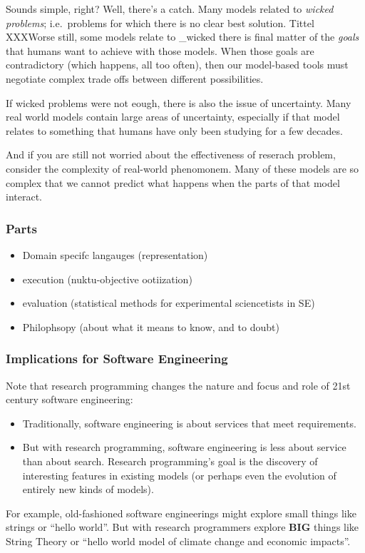 Sounds simple, right? Well, there's a catch. Many models related to
\emph{wicked problems}; i.e.~problems for which there is no clear best
solution. Tittel XXXWorse still, some models relate to \_wicked there is
final matter of the \emph{goals} that humans want to achieve with those
models. When those goals are contradictory (which happens, all too
often), then our model-based tools must negotiate complex trade offs
between different possibilities.

If wicked problems were not eough, there is also the issue of
uncertainty. Many real world models contain large areas of uncertainty,
especially if that model relates to something that humans have only been
studying for a few decades.

And if you are still not worried about the effectiveness of reserach
problem, consider the complexity of real-world phenomonem. Many of these
models are so complex that we cannot predict what happens when the parts
of that model interact.

\subsubsection{Parts}\label{parts}

\begin{itemize}
\itemsep1pt\parskip0pt
\item
  Domain specifc langauges (representation)
\item
  execution (nuktu-objective ootiization)
\item
  evaluation (statistical methods for experimental sciencetists in SE)
\item
  Philophsopy (about what it means to know, and to doubt)
\end{itemize}

\subsubsection{Implications for Software
Engineering}\label{implications-for-software-engineering}

Note that research programming changes the nature and focus and role of
21st century software engineering:

\begin{itemize}
\itemsep1pt\parskip0pt
\item
  Traditionally, software engineering is about services that meet
  requirements.
\item
  But with research programming, software engineering is less about
  service than about search. Research programming's goal is the
  discovery of interesting features in existing models (or perhaps even
  the evolution of entirely new kinds of models).
\end{itemize}

For example, old-fashioned software engineerings might explore small
things like strings or ``hello world''. But with research programmers
explore \textbf{BIG} things like String Theory or ``hello world model of
climate change and economic impacts''.
